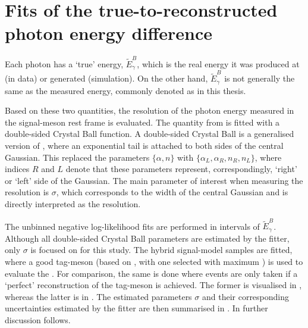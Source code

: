 \chapter{Fits of the true-to-reconstructed photon energy difference}\label{sec:appendix_resolution_fits}

Each photon has a `true' energy, $\tilde{E}_{\gamma}^B$, which is the real energy it was produced at (in data) or generated (simulation).
On the other hand, $\tilde{E}_{\gamma}^B$ is not generally the same as the measured energy, commonly denoted as \EB in this thesis.

Based on these two quantities, the resolution of the photon energy measured in the signal-\B meson rest frame is evaluated.
The quantity from  is fitted with a double-sided Crystal Ball function.
A double-sided Crystal Ball is a generalised version of , where an exponential tail is attached to both sides of the central Gaussian.
This replaced the parameters $\{\alpha,n\}$ with $\{\alpha_L,\alpha_R, n_R, n_L\}$, where indices $R$ and $L$ denote that these parameters represent, correspondingly, `right' or `left' side of the Gaussian.
The main parameter of interest when measuring the resolution is $\sigma$, which corresponds to the width of the central Gaussian and is directly interpreted as the resolution.

The unbinned negative log-likelihood fits are performed in intervals of $\tilde{E}_{\gamma}^B$.
Although all double-sided Crystal Ball parameters are estimated by the fitter, only $\sigma$ is focused on for this study.
The hybrid signal-model samples are fitted, where a good tag-\B meson (based on , 
with one selected with maximum \feiProb) is used to evaluate the \EB.
For comparison, the same is done where events are only taken if a `perfect' reconstruction of the tag-\B meson is achieved.
The former is visualised in , whereas the latter is in .
The estimated parameters $\sigma$ and their corresponding uncertainties estimated by the fitter are then summarised in .
In  further discussion follows.

